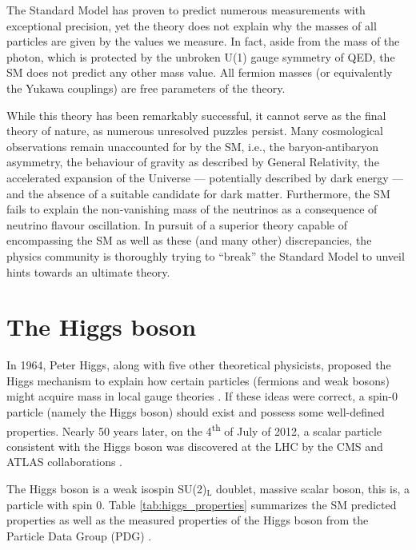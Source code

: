 The Standard Model has proven to predict numerous measurements with exceptional precision, yet the theory does not explain why the masses of all particles are given by the values we measure. In fact, aside from the mass of the photon, which is protected by the unbroken U(1) gauge symmetry of QED, the SM does not predict any other mass value. All fermion masses (or equivalently the Yukawa couplings) are free parameters of the theory.

While this theory has been remarkably successful, it cannot serve as the final theory of nature, as numerous unresolved puzzles persist. Many cosmological observations remain unaccounted for by the SM, i.e., the baryon-antibaryon asymmetry, the behaviour of gravity as described by General Relativity, the accelerated expansion of the Universe — potentially described by dark energy — and the absence of a suitable candidate for dark matter. Furthermore, the SM fails to explain the non-vanishing mass of the neutrinos as a consequence of neutrino flavour oscillation. In pursuit of a superior theory capable of encompassing the SM as well as these (and many other) discrepancies, the physics community is thoroughly trying to ``break'' the Standard Model to unveil hints towards an ultimate theory.

\section{The Higgs boson}

In 1964, Peter Higgs, along with five other theoretical physicists, proposed the Higgs mechanism to explain how certain particles (fermions and weak bosons) might acquire mass in local gauge theories \cite{Higgs:1964pj,Englert:1964et,Guralnik:1964eu}. If these ideas were correct, a spin-0 particle (namely the Higgs boson) should exist and possess some well-defined properties. Nearly 50 years later, on the 4\textsuperscript{th} of July of 2012, a scalar particle consistent with the Higgs boson was discovered at the LHC by the CMS and ATLAS collaborations \cite{CMS:2012qbp,ATLAS:2012yve}.

The Higgs boson is a weak isospin SU(2)$_{\text{L}}$ doublet, massive scalar boson, this is, a particle with spin 0. Table \ref{tab:higgs_properties} summarizes the SM predicted properties \cite{Djouadi:2005gi,LHCHiggsCrossSectionWorkingGroup:2016ypw} as well as the measured properties of the Higgs boson from the Particle Data Group (PDG) \cite{PDG}.

